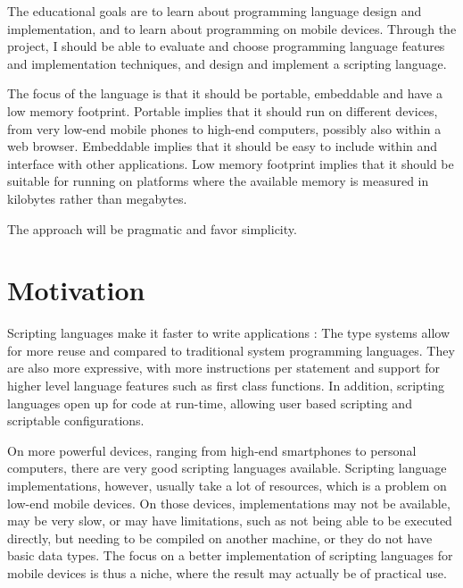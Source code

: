 \documentclass[11pt]{report}
\begin{document}
\begin{comment}
The motivation is that a scripting language makes it is easier to make applications for mobile 
devices, and that existing freely available scripting languages
are very limited, slow, or simply does not run on the low-end mobile devices.
\end{comment}

    The educational goals are to learn about programming language design and
implementation, and to learn about programming on mobile devices. Through the
project, I should be able to evaluate and choose programming language features
and implementation techniques, and design and implement a scripting language.

    The focus of the language is that it should be portable, embeddable and have
a low memory footprint. Portable implies that it should run on different devices,
from very low-end mobile phones to high-end computers, possibly also within a web browser. 
Embeddable implies that it should be easy to include within and interface with
other applications. Low memory footprint implies that it should be suitable for
running on platforms where the available memory is measured in kilobytes rather
than megabytes. 

    The approach will be pragmatic and favor simplicity.

\section{Motivation}
Scripting languages make it faster to write applications \cite{scripting-ousterhout}:
The type systems allow for more reuse and compared to traditional system programming languages.
They are also more expressive, with more instructions per statement and support for higher level language features such as first class functions.
In addition, scripting languages open up for code at run-time, allowing user based scripting and scriptable configurations.

On more powerful devices, ranging from high-end smartphones to personal computers, there are very good scripting languages available.
Scripting language implementations, however, usually take a lot of resources, which is a problem on low-end mobile devices. On those devices, implementations may not be available, may be very slow, or may have limitations, such as not being able to be executed directly, but needing to be compiled on another machine, or they do not have basic data types.
The focus on a better implementation of scripting languages for mobile devices is thus a niche, where the result may actually be of practical use.
\end{document}
